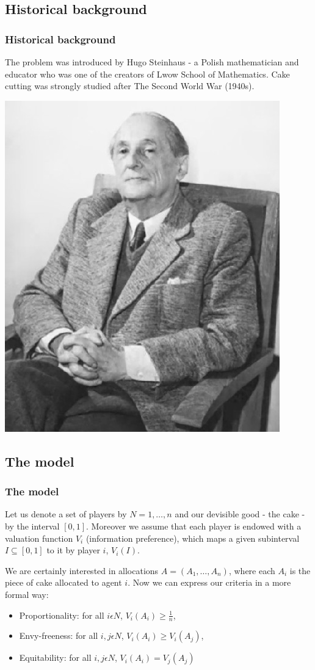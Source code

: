\documentclass{beamer}
\begin{document}
\subsection{Historical background}
\begin{frame}
\frametitle{Historical background}
The problem was introduced by Hugo Steinhaus - a Polish mathematician and educator who was one of the creators of Lwow School of Mathematics. Cake cutting was strongly studied after The Second World War (1940s). 
\begin{center}
\includegraphics[scale=0.2]{Hugo-Steinhaus.jpg}
\end{center}
\end{frame}


\subsection{The model}
\begin{frame}
\frametitle{The model}
    Let us denote a set of players by $N={1,\dots,n}$ and our devisible good - the cake - by the interval $[0,1]$. Moreover we assume that each player is endowed with a valuation function $V_{i}$ (information preference), which maps a given subinterval $I\subseteq[0,1]$ to it by player $i$, $V_{i}(I)$. 

    We are certainly interested in allocations $A=(A_1,\dots,A_n)$, where each $A_i$ is the piece of cake allocated to agent $i$. Now we can express our criteria in a more formal way:
\begin{itemize}
    \item Proportionality: for all $i\epsilon{N}$, $V_{i}(A_i)\geq\frac{1}{n}$,
    \item Envy-freeness: for all $i,j\epsilon{N}$, $V_{i}(A_i)\geq{V_i}(A_j)$,
    \item Equitability: for all $i,j\epsilon{N}$, $V_{i}(A_i)={V_j}(A_j)$
\end{itemize}
\end{frame}
\end{document}
